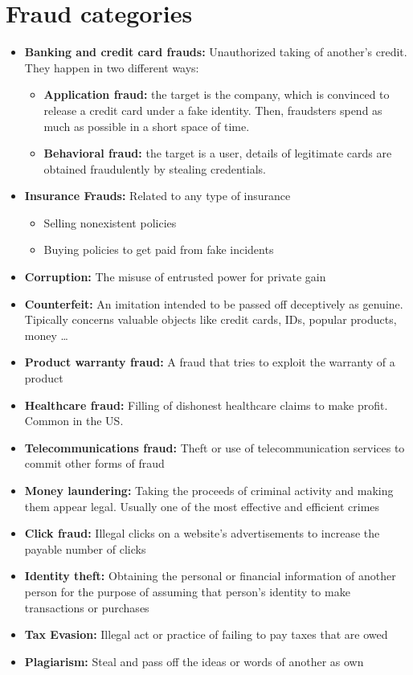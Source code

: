 \section{Fraud categories}
    \begin{itemize}
        \item \textbf{Banking and credit card frauds:} Unauthorized taking of another's credit. They happen in two different ways:
        \begin{itemize}
            \item \textbf{Application fraud:} the target is the company, which is convinced to release a credit card under a fake identity. Then, fraudsters spend as much as possible in a short space of time.
            \item \textbf{Behavioral fraud:} the target is a user, details of legitimate cards are obtained fraudulently by stealing credentials.
        \end{itemize}
        \item \textbf{Insurance Frauds:} Related to any type of insurance
        \begin{itemize}
            \item Selling nonexistent policies
            \item Buying policies to get paid from fake incidents
        \end{itemize}
        \item \textbf{Corruption:} The misuse of entrusted power for private gain
        \item \textbf{Counterfeit:} An imitation intended to be passed off deceptively as genuine. Tipically concerns valuable objects like credit cards, IDs, popular products, money \dots
        \item \textbf{Product warranty fraud:} A fraud that tries to exploit the warranty of a product
        \item \textbf{Healthcare fraud:} Filling of dishonest healthcare claims to make profit. Common in the US.
        \item \textbf{Telecommunications fraud:} Theft or use of telecommunication services to commit other forms of fraud
        \item \textbf{Money laundering:} Taking the proceeds of criminal activity and making them appear legal. Usually one of the most effective and efficient crimes 
        \item \textbf{Click fraud:} Illegal clicks on a website's advertisements to increase the payable number of clicks
        \item \textbf{Identity theft:} Obtaining the personal or financial information of another person for the purpose of assuming that person's identity to make transactions or purchases
        \item \textbf{Tax Evasion:} Illegal act or practice of failing to pay taxes that are owed 
        \item \textbf{Plagiarism:} Steal and pass off the ideas or words of another as own
    \end{itemize}

